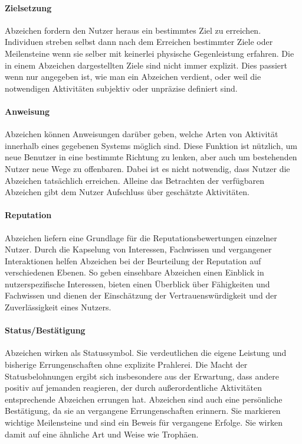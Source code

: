 \paragraph{Zielsetzung}
Abzeichen fordern den Nutzer heraus ein bestimmtes Ziel zu erreichen. Individuen streben selbst dann nach dem Erreichen bestimmter Ziele oder Meilensteine wenn sie selber mit keinerlei physische Gegenleistung erfahren. Die in einem Abzeichen dargestellten Ziele sind nicht immer explizit. Dies passiert wenn nur angegeben ist, wie man ein Abzeichen verdient, oder weil die notwendigen Aktivitäten subjektiv oder unpräzise definiert sind.

\paragraph{Anweisung}
Abzeichen können Anweisungen darüber geben, welche Arten von Aktivität innerhalb eines gegebenen Systems möglich sind. Diese
Funktion ist nützlich, um neue Benutzer in eine bestimmte Richtung zu lenken, aber auch um bestehenden Nutzer neue Wege zu offenbaren. Dabei ist es nicht notwendig, dass Nutzer die Abzeichen tatsächlich erreichen. Alleine das Betrachten der verfügbaren Abzeichen gibt dem Nutzer Aufschluss über geschätzte Aktivitäten.

\paragraph{Reputation}
Abzeichen liefern eine Grundlage für die Reputationsbewertungen einzelner Nutzer. Durch die Kapselung von Interessen, Fachwissen und vergangener Interaktionen helfen Abzeichen bei der Beurteilung der Reputation auf verschiedenen Ebenen. So geben einsehbare Abzeichen einen Einblick in nutzerspezifische Interessen, bieten einen Überblick über Fähigkeiten und Fachwissen und dienen der Einschätzung der Vertrauenswürdigkeit und der Zuverlässigkeit eines Nutzers. 

\paragraph{Status/Bestätigung}
Abzeichen wirken als Statussymbol. Sie verdeutlichen die eigene Leistung und bisherige Errungenschaften ohne explizite Prahlerei.
Die Macht der Statusbelohnungen ergibt sich insbesondere aus der Erwartung, dass andere positiv auf jemanden reagieren, der durch außerordentliche Aktivitäten entsprechende Abzeichen errungen hat. Abzeichen sind auch eine persönliche Bestätigung, da sie an vergangene Errungenschaften erinnern. Sie markieren wichtige Meilensteine und sind ein Beweis für vergangene Erfolge. Sie wirken damit auf eine ähnliche Art und Weise wie Trophäen.

